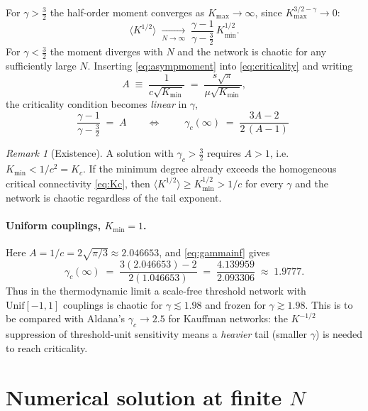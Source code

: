 \documentclass[11pt]{article}
\theoremstyle{remark}
\newtheorem{remark}{Remark}
\newcommand{\Kmin}{K_{\mathrm{min}}}
\newcommand{\Kmax}{K_{\mathrm{max}}}
\begin{document}
For $\gamma>\tfrac32$ the half-order moment converges as $\Kmax\to\infty$, since
$\Kmax^{3/2-\gamma}\to0$:
\begin{equation}
  \big\langle K^{1/2}\big\rangle
  \;\xrightarrow[N\to\infty]{}\;
  \frac{\gamma-1}{\gamma-\tfrac32}\,\Kmin^{1/2}.
  \label{eq:asympmoment}
\end{equation}
For $\gamma<\tfrac32$ the moment diverges with $N$ and the network is chaotic for
any sufficiently large $N$. Inserting \eqref{eq:asympmoment} into
\eqref{eq:criticality} and writing
\begin{equation}
  A \;\equiv\; \frac{1}{c\sqrt{\Kmin}} \;=\; \frac{s\sqrt{\pi}}{\mu\sqrt{\Kmin}},
\end{equation}
the criticality condition becomes \emph{linear} in $\gamma$,
\begin{equation}
  \frac{\gamma-1}{\gamma-\tfrac32}\;=\;A
  \qquad\Longleftrightarrow\qquad
  \boxed{\;\gamma_c(\infty)\;=\;\frac{3A-2}{2\,(A-1)}\;}
  \label{eq:gammainf}
\end{equation}

\begin{remark}[Existence]
A solution with $\gamma_c>\tfrac32$ requires $A>1$, i.e.
$\Kmin<1/c^2=K_c$. If the minimum degree already exceeds the homogeneous
critical connectivity \eqref{eq:Kc}, then $\langle K^{1/2}\rangle\ge
\Kmin^{1/2}>1/c$ for every $\gamma$ and the network is chaotic regardless of the
tail exponent.
\end{remark}

\paragraph{Uniform couplings, $\Kmin=1$.} Here $A=1/c=2\sqrt{\pi/3}\approx
2.046653$, and \eqref{eq:gammainf} gives
\begin{equation}
  \gamma_c(\infty)\;=\;\frac{3(2.046653)-2}{2(1.046653)}
  \;=\;\frac{4.139959}{2.093306}
  \;\approx\;1.9777 .
  \label{eq:answer}
\end{equation}
Thus in the thermodynamic limit a scale-free threshold network with
$\mathrm{Unif}[-1,1]$ couplings is chaotic for $\gamma\lesssim1.98$ and frozen
for $\gamma\gtrsim1.98$. This is to be compared with Aldana's $\gamma_c\to2.5$
for Kauffman networks: the $K^{-1/2}$ suppression of threshold-unit sensitivity
means a \emph{heavier} tail (smaller $\gamma$) is needed to reach criticality.

\section{Numerical solution at finite $N$}
\end{document}
